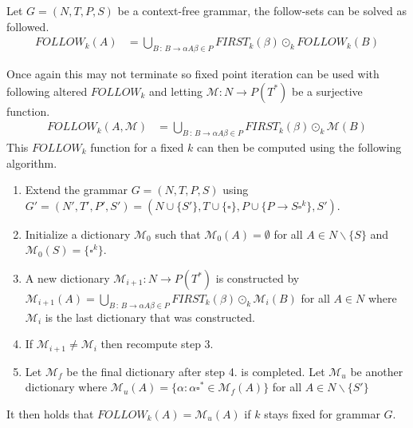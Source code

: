 \begin{algorithm}
    Let $G = (N, T, P, S)$ be a context-free grammar, the follow-sets can be solved as followed.
    \begin{align*}
        FOLLOW_k(A) &= \bigcup_{B \, : \, B \to \alpha A \beta \in P} FIRST_k(\beta) \odot_k FOLLOW_k(B)
    \end{align*}
\end{algorithm}
\noindent Once again this may not terminate so fixed point iteration can be used with following altered $FOLLOW_k$ and letting $\mathcal{M}: N \to P(T^*)$ be a surjective function.
\begin{align*}
    FOLLOW_k(A, \mathcal{M}) &= \bigcup_{B \,: \, B \to \alpha A \beta \in P} FIRST_k(\beta) \odot_k \mathcal{M}(B)
\end{align*}
This $FOLLOW_k$ function for a fixed $k$ can then be computed using the following algorithm.
\begin{enumerate}
    \item Extend the grammar $G = (N, T, P, S)$ using $G' = (N', T', P', S') = (N \cup \{S'\}, T \cup \{\square\}, P \cup \{P \to S \square^k\}, S')$.
    \item Initialize a dictionary $\mathcal{M}_0$ such that $\mathcal{M}_0(A) = \emptyset$ for all $A \in N \backslash \{S\}$ and $\mathcal{M}_0(S) = \{\square^k\}$.
    \item A new dictionary $\mathcal{M}_{i+1}: N \to P(T^*)$ is constructed by $\mathcal{M}_{i+1}(A) = \bigcup_{B \,: \, B \to  \alpha A \beta \in P} FIRST_k(\beta) \odot_k \mathcal{M}_{i}(B)$ for all $A \in N$ where $\mathcal{M}_{i}$ is the last dictionary that was constructed.
    \item If $\mathcal{M}_{i+1} \neq \mathcal{M}_{i}$ then recompute step 3.
    \item Let $\mathcal{M}_f$ be the final dictionary after step 4. is completed. Let $\mathcal{M}_u$ be another dictionary where $\mathcal{M}_u(A) = \{\alpha : \alpha \square^* \in \mathcal{M}_f(A)\}$ for all $A \in N \backslash \{S'\}$ 
\end{enumerate}
It then holds that $FOLLOW_k(A) = \mathcal{M}_u(A)$ if $k$ stays fixed for grammar $G$.